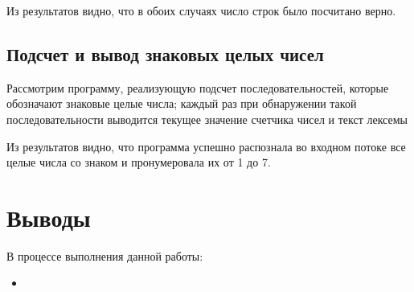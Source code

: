 
Из результатов видно, что в обоих случаях число строк было посчитано верно.

\subsection{Подсчет и вывод знаковых целых чисел}

Рассмотрим программу, реализующую подсчет последовательностей, которые обозначают знаковые целые числа; каждый раз при обнаружении такой последовательности выводится текущее значение счетчика чисел и текст лексемы



Из результатов видно, что программа успешно распознала во входном потоке все целые числа со знаком и пронумеровала их от 1 до 7.

\section{Выводы}

В процессе выполнения данной работы:

\begin{itemize}
	\item 
\end{itemize}


